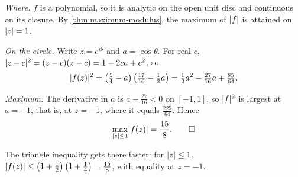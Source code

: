 \begin{solution}
  \emph{Where.} $f$ is a polynomial, so it is analytic on the open unit disc
  and continuous on its closure. By \cref{thm:maximum-modulus}, the maximum of
  $\lvert f\rvert$ is attained on $\lvert z\rvert = 1$.

  \emph{On the circle.} Write $z = e^{i\theta}$ and $a = \cos\theta$. For real
  $c$, $\lvert z - c\rvert^2 = (z - c)(\bar z - c) = 1 - 2ca + c^2$, so
  \[
    \lvert f(z)\rvert^2
    = \left(\tfrac54 - a\right)\left(\tfrac{17}{16} - \tfrac12 a\right)
    = \tfrac12 a^2 - \tfrac{27}{16} a + \tfrac{85}{64}.
  \]

  \emph{Maximum.} The derivative in $a$ is $a - \frac{27}{16} < 0$ on
  $[-1, 1]$, so $\lvert f\rvert^2$ is largest at $a = -1$, that is, at $z = -1$, where
  it equals $\frac{225}{64}$. Hence
  \[
    \max_{\lvert z\rvert \leq 1} \lvert f(z)\rvert = \frac{15}{8}. \qedhere
  \]
\end{solution}

\begin{remark}
  The triangle inequality gets there faster: for $\lvert z\rvert \leq 1$,
  $\lvert f(z)\rvert \leq \left(1 + \frac12\right)\left(1 + \frac14\right) = \frac{15}{8}$,
  with equality at $z = -1$.
\end{remark}
